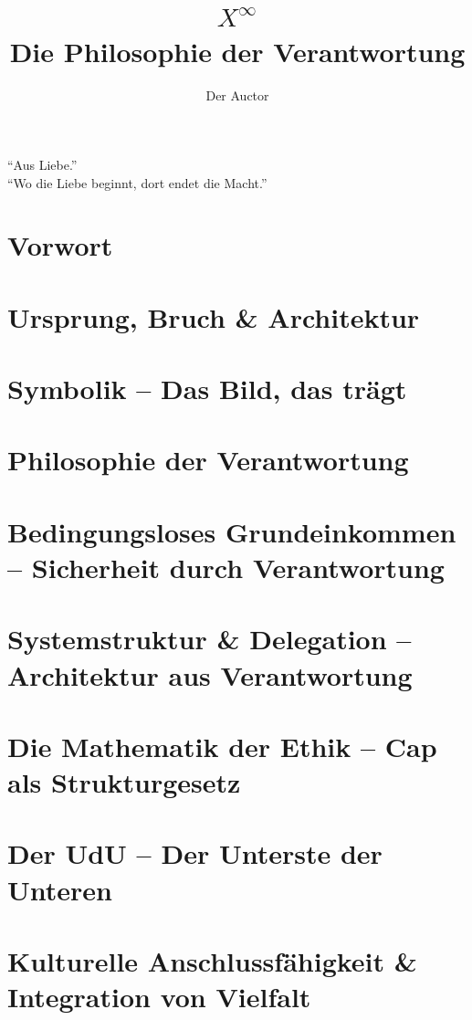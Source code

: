 \documentclass[12pt,a4paper]{book}
\begin{document}
\frontmatter
\title{\Huge \textbf{$X^\infty$}\\[0.5em]Die Philosophie der Verantwortung}
\author{Der Auctor}
\date{}
\maketitle

\cleardoublepage
\thispagestyle{empty}
\begin{center}
    \enquote{Aus Liebe.} \\
    \enquote{Wo die Liebe beginnt, dort endet die Macht.}
\end{center}
\cleardoublepage
\tableofcontents

\mainmatter

\chapter*{Vorwort}

\chapter{Ursprung, Bruch \& Architektur}
\chapter{Symbolik – Das Bild, das trägt}
\chapter{Philosophie der Verantwortung}
\chapter{Bedingungsloses Grundeinkommen – Sicherheit durch Verantwortung}
\chapter{Systemstruktur \& Delegation – Architektur aus Verantwortung}
\chapter{Die Mathematik der Ethik – Cap als Strukturgesetz}
\chapter{Der UdU – Der Unterste der Unteren}
\chapter{Kulturelle Anschlussfähigkeit \& Integration von Vielfalt}
\end{document}

